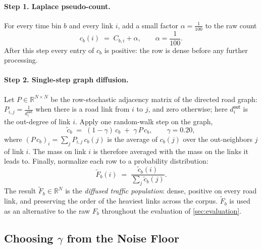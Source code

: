 \documentclass[sigconf, review]{acmart}
\begin{document}
\paragraph{Step 1. Laplace pseudo-count.}
\label{sec:laplace}

For every time bin $b$ and every link $i$, add a small factor $\alpha=\frac{1}{100}$ to the raw count 
\begin{equation}
\label{eq:laplace}
c_b(i) \;=\; C_{b, i} + \alpha,
\qquad \alpha = \frac{1}{100}.
\end{equation}
After this step every entry of $c_b$ is positive: the row is dense
before any further processing.

\paragraph{Step 2. Single-step graph diffusion.}
\label{sec:diffusion-step}

Let $P \in \mathbb{R}^{N \times N}$ be the row-stochastic adjacency
matrix of the directed road graph: $P_{i, j} = \frac{1}{d^{\textsf{out}}_i}$
when there is a road link from $i$ to $j$, and zero otherwise; here
$d^{\textsf{out}}_i$ is the out-degree of link $i$. Apply one
random-walk step on the graph,
\begin{equation}
\label{eq:diffuse}
\tilde c_b \;=\; (1 - \gamma)\, c_b \;+\; \gamma\, P\, c_b,
\qquad \gamma = 0.20,
\end{equation}
where $(P\, c_b)_i = \sum_{j} P_{i, j}\, c_b(j)$ is the average of
$c_b(j)$ over the out-neighbors $j$ of link $i$. The mass on link
$i$ is therefore averaged with the mass on the links it leads to.
Finally, normalize each row to a probability distribution:
\begin{equation}
\label{eq:diffused-prior}
\tilde F_b(i) \;=\; \frac{\tilde c_b(i)}{\sum_j \tilde c_b(j)}.
\end{equation}
The result $\tilde F_b \in \mathbb{R}^{N}$ is the
\emph{diffused traffic population}: dense, positive on every road link, and
preserving the order of the heaviest links across the corpus.
$\tilde F_b$ is used as an alternative to the raw $F_b$
throughout the evaluation of \cref{sec:evaluation}.

\subsection{Choosing $\gamma$ from the Noise Floor}
\end{document}

